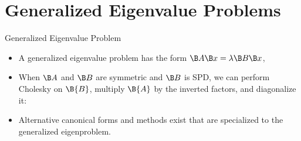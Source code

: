%
%
%
%
%
%



\section{Generalized Eigenvalue Problems}

\begin{frame}{Generalized Eigenvalue Problem}


\begin{itemize}
\item
A generalized eigenvalue problem has the form $\B A \B x = \lambda \B B \B x$, 
\item
When $\B A$ and $\B B$ are symmetric and $\B B$ is SPD, we can perform Cholesky on $\B{B}$, multiply $\B{A}$ by the inverted factors, and diagonalize it:
\item Alternative canonical forms and methods exist that are specialized to the generalized eigenproblem.

\end{itemize}


\end{frame}


